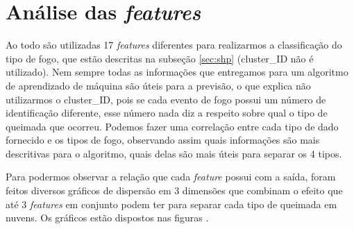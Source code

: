 \section{Análise das \textit{features}}


Ao todo são utilizadas 17 \textit{features} diferentes para realizarmos a classificação do tipo de fogo, que estão descritas na subseção \ref{sec:shp} (cluster\_ID não é utilizado). Nem sempre todas as informações que entregamos para um algoritmo de aprendizado de máquina são úteis para a previsão, o que explica não utilizarmos o cluster\_ID, pois se cada evento de fogo possui um número de identificação diferente, esse número nada diz a respeito sobre qual o tipo de queimada que ocorreu. Podemos fazer uma correlação entre cada tipo de dado fornecido e os tipos de fogo, observando assim quais informações são mais descritivas para o algoritmo, quais delas são mais úteis para separar os 4 tipos.

Para podermos observar a relação que cada \textit{feature} possui com a saída, foram feitos diversos gráficos de dispersão em 3 dimensões que combinam o efeito que até 3 \textit{features} em conjunto podem ter para separar cada tipo de queimada em nuvens. Os gráficos estão dispostos nas figuras .

